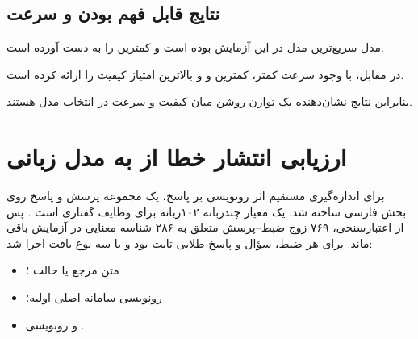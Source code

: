 \subsection{نتایج قابل فهم بودن و سرعت}

\begin{table}[H]
\centering
\caption{نتایج دقت و سرعت مدل‌های }
\label{tab:tts_runtime}

\end{table}

مدل  سریع‌ترین مدل  در این آزمایش بوده است و
کمترین  را به دست آورده است.

در مقابل،  با وجود سرعت کمتر، کمترین  و  و
بالاترین امتیاز کیفیت  را ارائه کرده است.

بنابراین نتایج نشان‌دهنده یک توازن روشن میان کیفیت و سرعت
در انتخاب مدل  هستند.


\section{ارزیابی انتشار خطا از  به مدل زبانی}

برای اندازه‌گیری مستقیم اثر رونویسی بر پاسخ، یک مجموعه پرسش و
پاسخ روی بخش فارسی  ساخته شد.  یک معیار
چندزبانه ۱۰۲زبانه برای وظایف گفتاری است \cite{conneau2022fleurs}.
پس از اعتبارسنجی، ۷۶۹ زوج ضبط--پرسش متعلق به ۲۸۶ شناسه معنایی
در آزمایش باقی ماند. برای هر ضبط، سؤال و پاسخ طلایی ثابت بود و
 با سه نوع بافت اجرا شد:

\begin{itemize}
    \item متن مرجع یا حالت ؛
    \item رونویسی سامانه اصلی اولیه؛
    \item و رونویسی .
\end{itemize}

